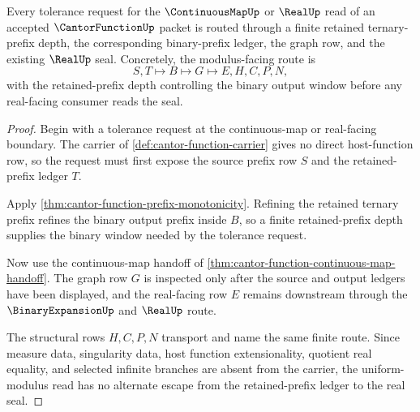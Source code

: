\begin{theorem}
\label{thm:cantor-function-uniform-modulus-route}
Every tolerance request for the $\ContinuousMapUp$ or $\RealUp$ read of an accepted $\CantorFunctionUp$ packet is routed through a finite retained ternary-prefix depth, the corresponding binary-prefix ledger, the graph row, and the existing $\RealUp$ seal. Concretely, the modulus-facing route is
$$
S,T \longmapsto B \longmapsto G \longmapsto E,H,C,P,N ,
$$
with the retained-prefix depth controlling the binary output window before any real-facing consumer reads the seal.
\end{theorem}
\begin{proof}
Begin with a tolerance request at the continuous-map or real-facing boundary. The carrier of \autoref{def:cantor-function-carrier} gives no direct host-function row, so the request must first expose the source prefix row $S$ and the retained-prefix ledger $T$.

Apply \autoref{thm:cantor-function-prefix-monotonicity}. Refining the retained ternary prefix refines the binary output prefix inside $B$, so a finite retained-prefix depth supplies the binary window needed by the tolerance request.

Now use the continuous-map handoff of \autoref{thm:cantor-function-continuous-map-handoff}. The graph row $G$ is inspected only after the source and output ledgers have been displayed, and the real-facing row $E$ remains downstream through the $\BinaryExpansionUp$ and $\RealUp$ route.

The structural rows $H,C,P,N$ transport and name the same finite route. Since measure data, singularity data, host function extensionality, quotient real equality, and selected infinite branches are absent from the carrier, the uniform-modulus read has no alternate escape from the retained-prefix ledger to the real seal.
\end{proof}



